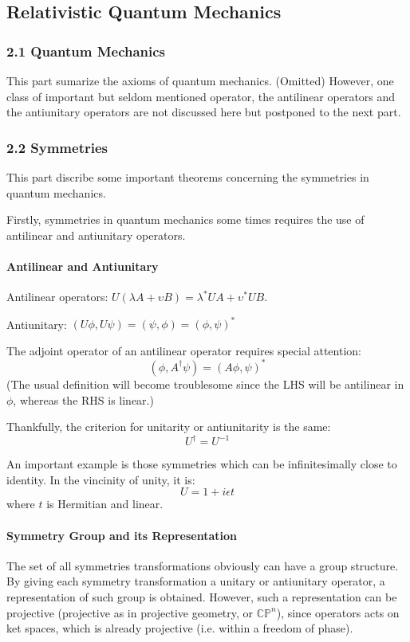 \subsection{Relativistic Quantum Mechanics}
\label{sec:Relatvistic_Quantum_Mechanics}

\subsubsection{2.1 Quantum Mechanics}
\label{sec:2.1_Quantum_Mechanics}
This part sumarize the axioms of quantum mechanics. (Omitted)
However, one class of important but seldom mentioned operator,
the antilinear operators and the antiunitary operators are not
discussed here but postponed to the next part.

\subsubsection{2.2 Symmetries}
\label{sec:2.2_Symmetries}
This part discribe some important theorems concerning the symmetries
in quantum mechanics.

Firstly, symmetries in quantum mechanics some times requires the use
of antilinear and antiunitary operators.

\paragraph{Antilinear and Antiunitary}
Antilinear operators: $U (\lambda A + \upsilon B)
                        = \lambda^* UA + \upsilon^* UB$.

Antiunitary: $ (U \phi, U \psi) = (\psi, \phi) = (\phi,\psi)^*$

The adjoint operator of an antilinear operator requires special
attention:
$$ (\phi, A^\dagger\psi) = (A\phi, \psi)^*$$
(The usual definition will become troublesome since the LHS will
be antilinear in $\phi$, whereas the RHS is linear.)

Thankfully, the criterion for unitarity or antiunitarity is the same:
$$U^\dagger = U^{-1}$$

An important example is those symmetries which can be infinitesimally
close to identity. In the vincinity of unity, it is:
$$ U =1+i\epsilon t $$
where $t$ is Hermitian and linear.

\paragraph{Symmetry Group and its Representation} The set of all
symmetries transformations obviously can have a group structure.
By giving each symmetry transformation a unitary or antiunitary
operator, a representation of such group is obtained. However,
such a representation can be projective (projective as in
projective geometry, or $\mathbb{CP}^n$), since operators acts
on ket spaces, which is already projective (i.e. within a freedom of
phase). 

